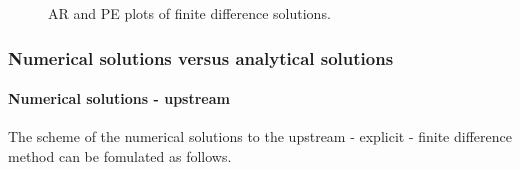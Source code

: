 \begin{figure}[!htbp]
    \centering
    \qquad
    \caption{AR and PE plots of finite difference solutions.}
    \label{fig:1}
\end{figure}

\subsubsection{Numerical solutions versus analytical solutions}
\paragraph{Numerical solutions - upstream} The scheme of the numerical solutions to the upstream - explicit - finite difference method can be fomulated as follows.

